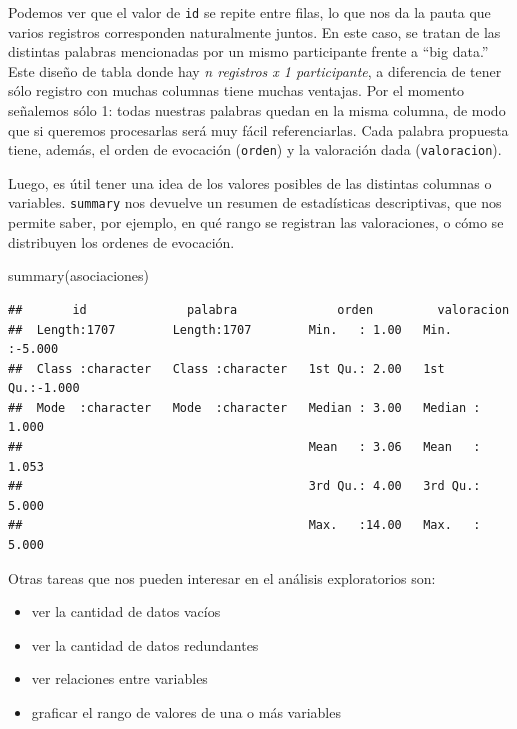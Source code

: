 \documentclass[
]{book}
\newenvironment{Shaded}{\begin{snugshade}}{\end{snugshade}}
\newcommand{\FunctionTok}[1]{\textcolor[rgb]{0.00,0.00,0.00}{#1}}
\newcommand{\NormalTok}[1]{#1}
\providecommand{\tightlist}{%
  \setlength{\itemsep}{0pt}\setlength{\parskip}{0pt}}
\begin{document}
Podemos ver que el valor de \texttt{id} se repite entre filas, lo que nos da la pauta que varios registros corresponden naturalmente juntos. En este caso, se tratan de las distintas palabras mencionadas por un mismo participante frente a ``big data.'' Este diseño de tabla donde hay \emph{n registros x 1 participante}, a diferencia de tener sólo registro con muchas columnas tiene muchas ventajas. Por el momento señalemos sólo 1: todas nuestras palabras quedan en la misma columna, de modo que si queremos procesarlas será muy fácil referenciarlas. Cada palabra propuesta tiene, además, el orden de evocación (\texttt{orden}) y la valoración dada (\texttt{valoracion}).

Luego, es útil tener una idea de los valores posibles de las distintas columnas o variables. \texttt{summary} nos devuelve un resumen de estadísticas descriptivas, que nos permite saber, por ejemplo, en qué rango se registran las valoraciones, o cómo se distribuyen los ordenes de evocación.

\begin{Shaded}
\begin{Highlighting}[]
\FunctionTok{summary}\NormalTok{(asociaciones)}
\end{Highlighting}
\end{Shaded}

\begin{verbatim}
##       id              palabra              orden         valoracion    
##  Length:1707        Length:1707        Min.   : 1.00   Min.   :-5.000  
##  Class :character   Class :character   1st Qu.: 2.00   1st Qu.:-1.000  
##  Mode  :character   Mode  :character   Median : 3.00   Median : 1.000  
##                                        Mean   : 3.06   Mean   : 1.053  
##                                        3rd Qu.: 4.00   3rd Qu.: 5.000  
##                                        Max.   :14.00   Max.   : 5.000
\end{verbatim}

Otras tareas que nos pueden interesar en el análisis exploratorios son:

\begin{itemize}
\tightlist
\item
  ver la cantidad de datos vacíos
\item
  ver la cantidad de datos redundantes
\item
  ver relaciones entre variables
\item
  graficar el rango de valores de una o más variables
\end{itemize}
\end{document}

